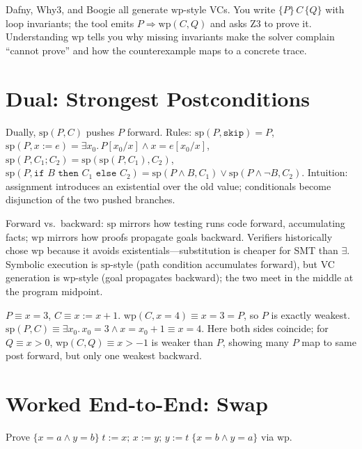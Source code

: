\begin{remark}[Automation]
Dafny, Why3, and Boogie all generate $\text{wp}$-style VCs. You write $\{P\}\,C\,\{Q\}$ with loop invariants; the tool emits $P\Rightarrow\text{wp}(C,Q)$ and asks Z3 to prove it. Understanding $\text{wp}$ tells you why missing invariants make the solver complain ``cannot prove'' and how the counterexample maps to a concrete trace.
\end{remark}

\section{Dual: Strongest Postconditions}
\label{sec:sp}
Dually, $\text{sp}(P,C)$ pushes $P$ forward. Rules: $\text{sp}(P,\texttt{skip})=P$, $\text{sp}(P,x:=e)=\exists x_0.\,P[x_0/x]\land x=e[x_0/x]$, $\text{sp}(P,C_1;C_2)=\text{sp}(\text{sp}(P,C_1),C_2)$, $\text{sp}(P,\texttt{if }B\texttt{ then }C_1\texttt{ else }C_2)=\text{sp}(P\land B,C_1)\lor\text{sp}(P\land\neg B,C_2)$. Intuition: assignment introduces an existential over the old value; conditionals become disjunction of the two pushed branches.

Forward vs.\ backward: $\text{sp}$ mirrors how testing runs code forward, accumulating facts; $\text{wp}$ mirrors how proofs propagate goals backward. Verifiers historically chose $\text{wp}$ because it avoids existentials—substitution is cheaper for SMT than $\exists$. Symbolic execution is $\text{sp}$-style (path condition accumulates forward), but VC generation is $\text{wp}$-style (goal propagates backward); the two meet in the middle at the program midpoint.

\begin{example}[sp vs wp]
$P\equiv x=3$, $C\equiv x:=x+1$. $\text{wp}(C,x=4)\equiv x=3=P$, so $P$ is exactly weakest. $\text{sp}(P,C)\equiv \exists x_0.\,x_0=3\land x=x_0+1\equiv x=4$. Here both sides coincide; for $Q\equiv x>0$, $\text{wp}(C,Q)\equiv x>-1$ is weaker than $P$, showing many $P$ map to same post forward, but only one weakest backward.
\end{example}

\section{Worked End-to-End: Swap}
\label{sec:swap-wp}
Prove $\{x=a\land y=b\}\;t:=x;\,x:=y;\,y:=t\;\{x=b\land y=a\}$ via $\text{wp}$.

